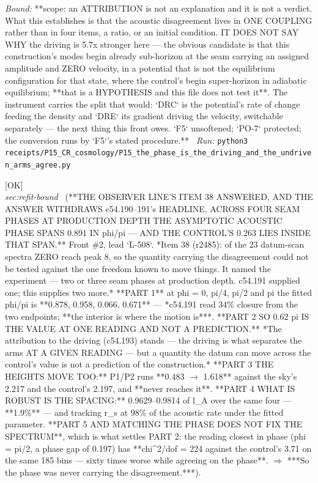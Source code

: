 \begin{description}
 \emph{Bound:} **scope: an ATTRIBUTION is not an explanation and it is not a verdict. What this establishes is that the acoustic disagreement lives in ONE COUPLING rather than in four items, a ratio, or an initial condition. IT DOES NOT SAY WHY the driving is 5.7x stronger here --- the obvious candidate is that this construction's modes begin already sub-horizon at the seam carrying an assigned amplitude and ZERO velocity, in a potential that is not the equilibrium configuration for that state, where the control's begin super-horizon in adiabatic equilibrium; **that is a HYPOTHESIS and this file does not test it**. The instrument carries the split that would: `DRC` is the potential's rate of change feeding the density and `DRE` its gradient driving the velocity, switchable separately --- the next thing this front owes. `F5` unsoftened; `PO-7` protected; the conversion runs by `F5`'s stated procedure.**
\ \emph{Run:} \texttt{python3 receipts/P15\_CR\_cosmology/P15\_the\_phase\_is\_the\_driving\_and\_the\_undriven\_arms\_agree.py}
\item[\rcptlabel{P15_the_phase_moves_with_the_datum_and_only_the_spacing_does_not}{P15R78}\textbf{P15R78}\quad\texttt{P15\_the\_phase\_moves\_with\_the\_datum\_and\_only\_the\_spacing\_does\_not}]\hfill\textsf{[OK]}\\
\textit{sec:refit-bound} \ (**THE OBSERVER LINE'S ITEM 38 ANSWERED, AND THE ANSWER WITHDRAWS c54.190--191's HEADLINE. ACROSS FOUR SEAM PHASES AT PRODUCTION DEPTH THE ASYMPTOTIC ACOUSTIC PHASE SPANS 0.891 IN phi/pi --- AND THE CONTROL'S 0.263 LIES INSIDE THAT SPAN.** Front \#2, lead `L-508`. *Item 38 (r2485): of the 23 datum-scan spectra ZERO reach peak 8, so the quantity carrying the disagreement could not be tested against the one freedom known to move things. It named the experiment --- two or three seam phases at production depth. c54.191 supplied one; this supplies two more.* **PART 1** at phi = 0, pi/4, pi/2 and pi the fitted phi/pi is **0.878, 0.958, 0.066, 0.671** --- *c54.191 read 34\% closure from the two endpoints; **the interior is where the motion is***. **PART 2 SO 0.62 pi IS THE VALUE AT ONE READING AND NOT A PREDICTION.** *The attribution to the driving (c54.193) stands --- the driving is what separates the arms AT A GIVEN READING --- but a quantity the datum can move across the control's value is not a prediction of the construction.* **PART 3 THE HEIGHTS MOVE TOO:** P1/P2 runs **0.483 \ensuremath{\to} 1.618** against the sky's 2.217 and the control's 2.197, and **never reaches it**. **PART 4 WHAT IS ROBUST IS THE SPACING:** 0.9629--0.9814 of l\_A over the same four --- **1.9\%** --- and tracking r\_s at 98\% of the acoustic rate under the fitted parameter. **PART 5 AND MATCHING THE PHASE DOES NOT FIX THE SPECTRUM**, which is what settles PART 2: the reading closest in phase (phi = pi/2, a phase gap of 0.197) has **chi\textasciicircum{}2/dof = 224 against the control's 3.71 on the same 185 bins --- sixty times worse while agreeing on the phase**. \ensuremath{\Rightarrow} ***So the phase was never carrying the disagreement.***). 

\end{description}
